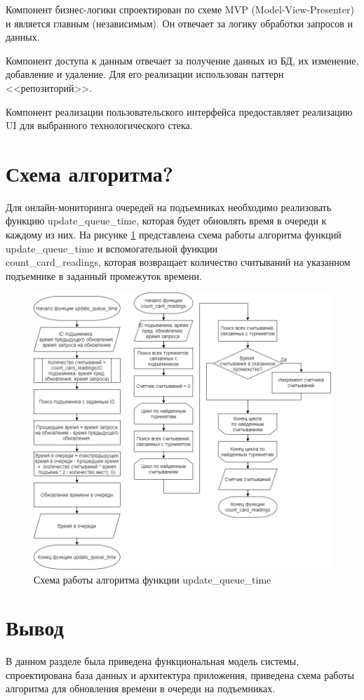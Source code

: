 Компонент бизнес-логики спроектирован по схеме MVP (Model-View-Presenter) и является главным (независимым). Он отвечает за логику обработки запросов и данных.

Компонент доступа к данным отвечает за получение данных из БД, их изменение, добавление и удаление. Для его реализации использован паттерн <<репозиторий>>. 

Компонент реализации пользовательского интерфейса предоставляет реализацию UI для выбранного технологического стека.

\section{Схема алгоритма?}\label{func_label}

Для онлайн-мониторинга очередей на подъемниках необходимо реализовать функцию update\_queue\_time, которая будет обновлять время в очереди к каждому из них. На рисунке \ref{img:function} представлена схема работы алгоритма функций update\_queue\_time и вспомогательной функции \\count\_card\_readings, которая возвращает количество считываний на указанном подъемнике в заданный промежуток времени.

\begin{figure}[h!]
	\begin{center}
		\includegraphics[scale=0.55]{../imgs/function.png}
	\end{center}
	\captionsetup{justification=centering}
	\caption{Схема работы алгоритма функции update\_queue\_time}
	\label{img:function}
\end{figure}

\clearpage
\section*{Вывод}

В данном разделе была приведена функциональная модель системы, спроектирована база данных и архитектура приложения, приведена схема работы алгоритма для обновления времени в очереди на подъемниках.




